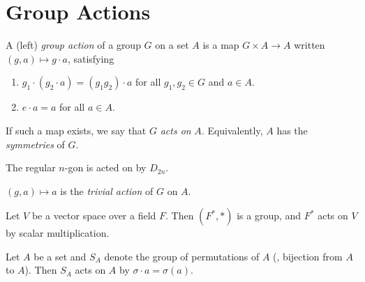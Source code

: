 \section{Group Actions} \label{sec:group_actions}
\begin{definition} \label{def:group_action}
    A (left) \emph{group action} of a group $G$ on a set $A$ is a map
    $G \times A \to A$ written $(g, a) \mapsto g \cdot a$, satisfying
    \begin{enumerate}
        \item $g_1 \cdot (g_2 \cdot a) = (g_1 g_2) \cdot a$ for all
            $g_1, g_2 \in G$ and $a \in A$.
        \item $e \cdot a = a$ for all $a \in A$.
    \end{enumerate}
    If such a map exists, we say that $G$ \emph{acts on} $A$.
    Equivalently, $A$ has the \emph{symmetries} of $G$.
\end{definition}
\begin{examples}
    \item The regular $n$-gon is acted on by $D_{2n}$.
    \item $(g, a) \mapsto a$ is the \emph{trivial action} of $G$ on $A$.
    \item Let $V$ be a vector space over a field $F$.
    Then $(F^*, *)$ is a group, and $F^*$ acts on $V$ by scalar
    multiplication.
    \item Let $A$ be a set and $S_A$ denote the group of permutations of
    $A$ (\ie, bijection from $A$ to $A$).
    Then $S_A$ acts on $A$ by $\sigma \cdot a = \sigma(a)$.
\end{examples}

